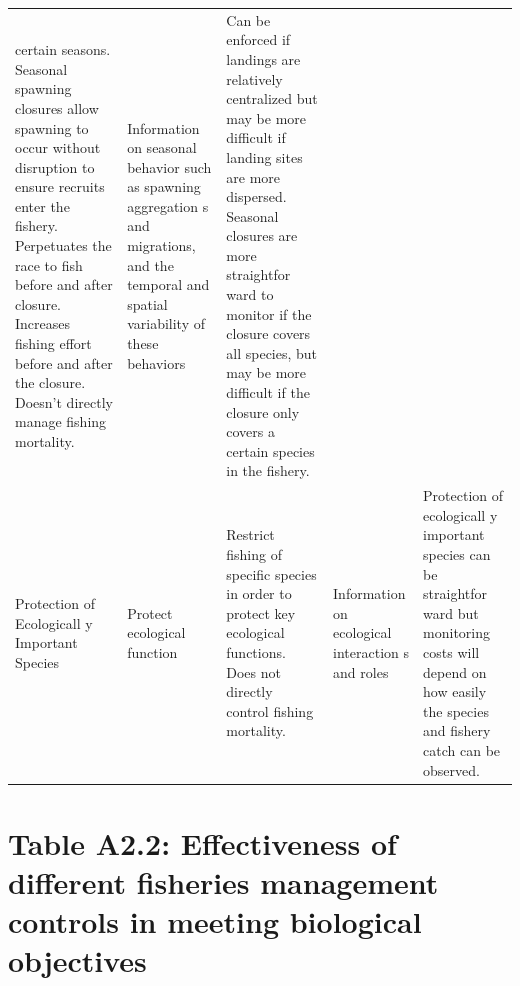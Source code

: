 \documentclass[]{book}
\begin{document}
\begin{longtable}[]{@{}lllll@{}}
\begin{minipage}[t]{0.17\columnwidth}
certain seasons. Seasonal spawning closures allow spawning to occur
without disruption to ensure recruits enter the fishery. Perpetuates the
race to fish before and after closure. Increases fishing effort before
and after the closure. Doesn't directly manage fishing mortality.\strut
\end{minipage} & \begin{minipage}[t]{0.17\columnwidth}\raggedright\strut
Information on seasonal behavior such as spawning aggregation s and
migrations, and the temporal and spatial variability of these
behaviors\strut
\end{minipage} & \begin{minipage}[t]{0.17\columnwidth}\raggedright\strut
Can be enforced if landings are relatively centralized but may be more
difficult if landing sites are more dispersed. Seasonal closures are
more straightfor ward to monitor if the closure covers all species, but
may be more difficult if the closure only covers a certain species in
the fishery.\strut
\end{minipage}\tabularnewline
\begin{minipage}[t]{0.17\columnwidth}\raggedright\strut
Protection of Ecologicall y Important Species\strut
\end{minipage} & \begin{minipage}[t]{0.17\columnwidth}\raggedright\strut
Protect ecological function\strut
\end{minipage} & \begin{minipage}[t]{0.17\columnwidth}\raggedright\strut
Restrict fishing of specific species in order to protect key ecological
functions. Does not directly control fishing mortality.\strut
\end{minipage} & \begin{minipage}[t]{0.17\columnwidth}\raggedright\strut
Information on ecological interaction s and roles\strut
\end{minipage} & \begin{minipage}[t]{0.17\columnwidth}\raggedright\strut
Protection of ecologicall y important species can be straightfor ward
but monitoring costs will depend on how easily the species and fishery
catch can be observed.\strut
\end{minipage}\tabularnewline
\bottomrule
\end{longtable}

\section{Table A2.2: Effectiveness of different fisheries management
controls in meeting biological
objectives}\label{table-a2.2-effectiveness-of-different-fisheries-management-controls-in-meeting-biological-objectives}
\end{document}
